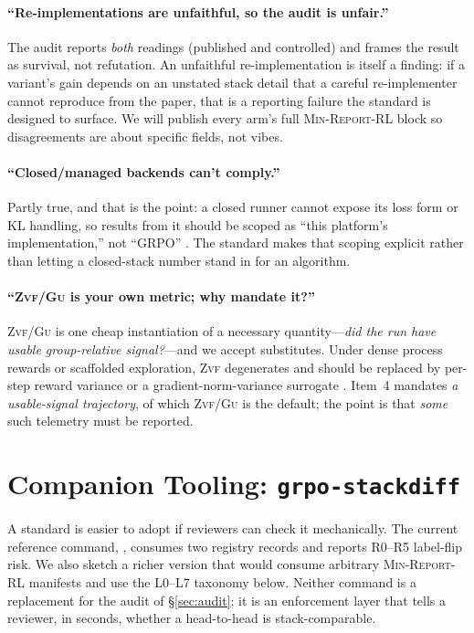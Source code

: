 \documentclass[11pt]{article}
\newcommand{\zvf}{\textsc{Zvf}}
\newcommand{\gu}{\textsc{Gu}}
\newcommand{\minreport}{\textsc{Min-Report-RL}}
\begin{document}
\paragraph{``Re-implementations are unfaithful, so the audit is unfair.''}
The audit reports \emph{both} readings (published and controlled) and frames the
result as survival, not refutation. An unfaithful re-implementation is itself a
finding: if a variant's gain depends on an unstated stack detail that a careful
re-implementer cannot reproduce from the paper, that is a reporting failure the
standard is designed to surface. We will publish every arm's full \minreport{}
block so disagreements are about specific fields, not vibes.

\paragraph{``Closed/managed backends can't comply.''}
Partly true, and that is the point: a closed runner cannot expose its loss form
or KL handling, so results from it should be scoped as ``this platform's
implementation,'' not ``GRPO'' \cite{zvfaudit2026}. The standard makes that
scoping explicit rather than letting a closed-stack number stand in for an
algorithm.

\paragraph{``\zvf{}/\gu{} is your own metric; why mandate it?''}
\zvf{}/\gu{} is one cheap instantiation of a necessary quantity---\emph{did the
run have usable group-relative signal?}---and we accept substitutes. Under
dense process rewards or scaffolded exploration, \zvf{} degenerates and should
be replaced by per-step reward variance or a gradient-norm-variance surrogate
\cite{zvfaudit2026}. Item~4 mandates \emph{a usable-signal trajectory}, of which
\zvf{}/\gu{} is the default; the point is that \emph{some} such telemetry must be
reported.

\section{Companion Tooling: \texttt{grpo-stackdiff}}
\label{sec:tooling}


A standard is easier to adopt if reviewers can check it mechanically. The
current reference command,
,
consumes two registry records and reports R0--R5 label-flip risk. We also sketch
a richer version that would consume arbitrary \minreport{} manifests and use
the L0--L7 taxonomy below. Neither command is a replacement for the audit of
\S\ref{sec:audit}; it is an enforcement layer that tells a reviewer, in
seconds, whether a head-to-head is stack-comparable.
\end{document}
